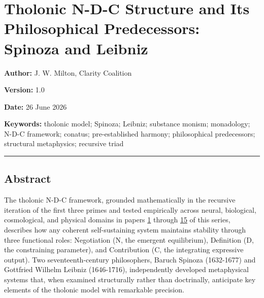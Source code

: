 \documentclass[
  11pt,
  letterpaper,
]{article}
\author{}
\date{}
\begin{document}
\section{Tholonic N-D-C Structure and Its Philosophical Predecessors:
Spinoza and
Leibniz}\label{tholonic-n-d-c-structure-and-its-philosophical-predecessors-spinoza-and-leibniz}

\textbf{Author:} J. W. Milton, Clarity Coalition

\textbf{Version:} 1.0

\textbf{Date:} 26 June 2026

\textbf{Keywords:} tholonic model; Spinoza; Leibniz; substance monism;
monadology; N-D-C framework; conatus; pre-established harmony;
philosophical predecessors; structural metaphysics; recursive triad

\begin{center}\rule{0.5\linewidth}{0.5pt}\end{center}

\subsection{Abstract}\label{abstract}

The tholonic N-D-C framework, grounded mathematically in the recursive
iteration of the first three primes and tested empirically across
neural, biological, cosmological, and physical domains in papers
\href{https://github.com/baardev/truevalue/blob/main/docnav/Research/papers/1_recursive-tholonic-five-constants/1_recursive-tholonic-five-constants.pdf}{1}
through
\href{https://github.com/baardev/truevalue/blob/main/docnav/Research/papers/15_consciousness-dmn-d-apparatus/15_consciousness-dmn-d-apparatus.pdf}{15}
of this series, describes how any coherent self-sustaining system
maintains stability through three functional roles: Negotiation (N, the
emergent equilibrium), Definition (D, the constraining parameter), and
Contribution (C, the integrating expressive output). Two
seventeenth-century philosophers, Baruch Spinoza (1632-1677) and
Gottfried Wilhelm Leibniz (1646-1716), independently developed
metaphysical systems that, when examined structurally rather than
doctrinally, anticipate key elements of the tholonic model with
remarkable precision.
\end{document}
